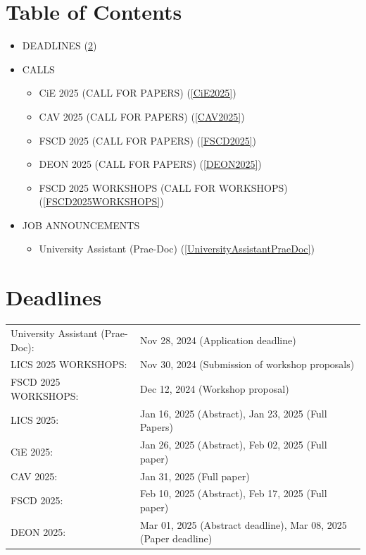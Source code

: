 \documentclass[prodmode,acmtecs]{acmsmall} %
\begin{document}
\section{Table of Contents}\begin{itemize}\item DEADLINES (\cref{deadlines}) 
 
\item CALLS 
 
\begin{itemize}\item CiE 2025 (CALL FOR PAPERS) (\cref{CiE2025})
\item CAV 2025 (CALL FOR PAPERS) (\cref{CAV2025})
\item FSCD 2025 (CALL FOR PAPERS) (\cref{FSCD2025})
\item DEON 2025 (CALL FOR PAPERS) (\cref{DEON2025})
\item FSCD 2025 WORKSHOPS (CALL FOR WORKSHOPS) (\cref{FSCD2025WORKSHOPS})
\end{itemize} 
\item JOB ANNOUNCEMENTS 
 
\begin{itemize}\item University Assistant (Prae-Doc) (\cref{UniversityAssistantPraeDoc})
\end{itemize} 
\end{itemize}\section{Deadlines}\label{deadlines}\begin{tabulary}{\linewidth}{LL}University Assistant (Prae-Doc):  & Nov 28, 2024 (Application deadline) \\
LICS 2025 WORKSHOPS:  & Nov 30, 2024 (Submission of workshop proposals) \\
FSCD 2025 WORKSHOPS:  & Dec 12, 2024 (Workshop proposal) \\
LICS 2025:  & Jan 16, 2025 (Abstract), Jan 23, 2025 (Full Papers) \\
CiE 2025:  & Jan 26, 2025 (Abstract), Feb 02, 2025 (Full paper) \\
CAV 2025:  & Jan 31, 2025 (Full paper) \\
FSCD 2025:  & Feb 10, 2025 (Abstract), Feb 17, 2025 (Full paper) \\
DEON 2025:  & Mar 01, 2025 (Abstract  deadline), Mar 08, 2025 (Paper  deadline) \\
\end{tabulary}
\end{document}
